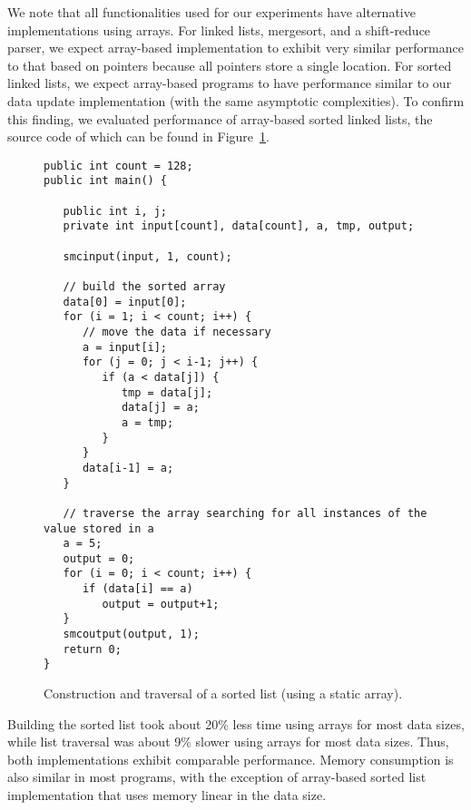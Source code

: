 \documentclass[11pt]{article}
\begin{document}
We note that all functionalities used for our experiments have alternative
implementations using arrays. For linked lists, mergesort, and a shift-reduce
parser, we expect array-based implementation to exhibit very similar
performance to that based on pointers because all pointers store a single
location. For sorted linked lists, we expect array-based programs to have
performance similar to our data update implementation (with the same
asymptotic complexities). To confirm this finding, we evaluated performance
of array-based sorted linked lists, the source code of which can be found in
Figure~\ref{fig:sl-ar}. 
\begin{figure}[t!]\small
\begin{verbatim}
public int count = 128; 
public int main() {

   public int i, j;
   private int input[count], data[count], a, tmp, output;

   smcinput(input, 1, count);
   
   // build the sorted array
   data[0] = input[0];
   for (i = 1; i < count; i++) {
      // move the data if necessary
      a = input[i];
      for (j = 0; j < i-1; j++) {
         if (a < data[j]) {
            tmp = data[j];
            data[j] = a;
            a = tmp;
         }
      }
      data[i-1] = a;
   }
 
   // traverse the array searching for all instances of the value stored in a
   a = 5;  
   output = 0;
   for (i = 0; i < count; i++) {
      if (data[i] == a) 
         output = output+1;
   }
   smcoutput(output, 1);
   return 0;
}\end{verbatim}
\caption{Construction and traversal of a sorted list (using a static
  array).} \label{fig:sl-ar}
\end{figure}
Building the sorted list took about 20\% less time using arrays for most
data sizes, while list traversal was about 9\% slower using arrays for most
data sizes. Thus, both implementations exhibit comparable performance.
Memory consumption is also similar in most programs, with the exception of
array-based sorted list implementation that uses memory linear in the data
size.
\end{document}

